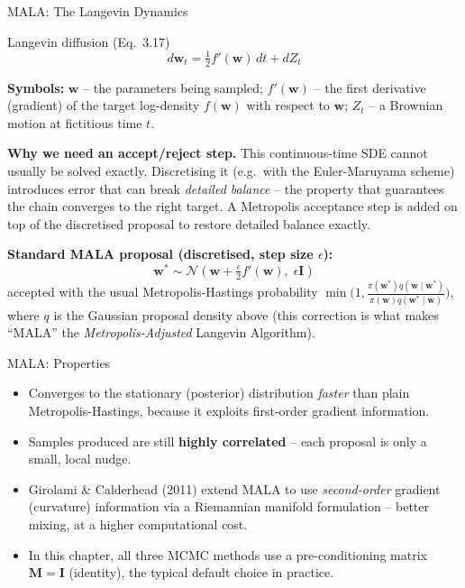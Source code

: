 \documentclass[aspectratio=169,10pt]{beamer}
\newcommand{\bw}{\mathbf{w}}
\begin{document}
\begin{frame}{MALA: The Langevin Dynamics}
  \begin{block}{Langevin diffusion (Eq.~3.17)}
  \begin{equation}
    d\bw_t = \tfrac12 f'(\bw)\, dt + dZ_t
  \end{equation}
  \end{block}
  \textbf{Symbols:} $\bw$ -- the parameters being sampled; $f'(\bw)$ -- the
  first derivative (gradient) of the target log-density $f(\bw)$ with respect
  to $\bw$; $Z_t$ -- a Brownian motion at fictitious time $t$.

  \vspace{2mm}
  \textbf{Why we need an accept/reject step.} This continuous-time SDE cannot
  usually be solved exactly. Discretising it (e.g.\ with the Euler-Maruyama
  scheme) introduces error that can break \emph{detailed balance} -- the
  property that guarantees the chain converges to the right target. A
  Metropolis acceptance step is added on top of the discretised proposal to
  restore detailed balance exactly.

  \vspace{2mm}
  \textbf{Standard MALA proposal (discretised, step size $\epsilon$):}
  \begin{equation}
    \bw^* \sim \mathcal{N}\!\left(\bw + \tfrac{\epsilon}{2} f'(\bw),\; \epsilon \mathbf{I}\right)
  \end{equation}
  accepted with the usual Metropolis-Hastings probability
  $\min\!\big(1, \tfrac{\pi(\bw^*) q(\bw\mid \bw^*)}{\pi(\bw) q(\bw^*\mid \bw)}\big)$,
  where $q$ is the Gaussian proposal density above (this correction is what
  makes ``MALA'' the \emph{Metropolis-Adjusted} Langevin Algorithm).
\end{frame}

\begin{frame}{MALA: Properties}
  \begin{itemize}
    \item Converges to the stationary (posterior) distribution \emph{faster}
      than plain Metropolis-Hastings, because it exploits first-order
      gradient information.
    \item Samples produced are still \textbf{highly correlated} -- each
      proposal is only a small, local nudge.
    \item Girolami \& Calderhead (2011) extend MALA to use
      \emph{second-order} gradient (curvature) information via a Riemannian
      manifold formulation -- better mixing, at a higher computational cost.
    \item In this chapter, all three MCMC methods use a pre-conditioning
      matrix $\mathbf{M}=\mathbf{I}$ (identity), the typical default choice in
      practice.
  \end{itemize}
\end{frame}
\end{document}
